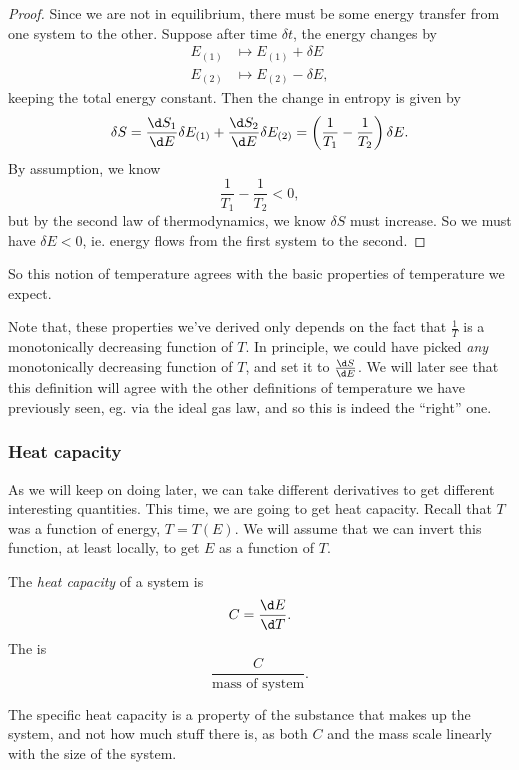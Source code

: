 \documentclass[a4paper]{article}
\begin{document}
\begin{proof}
  Since we are not in equilibrium, there must be some energy transfer from one system to the other. Suppose after time $\delta t$, the energy changes by
  \begin{align*}
    E_{(1)} & \mapsto E_{(1)} + \delta E\\
    E_{(2)} & \mapsto E_{(2)} - \delta E,
  \end{align*}
  keeping the total energy constant. Then the change in entropy is given by
  \[
    \delta S = \frac{\d S_1}{\d E} \delta E_{(1)} + \frac{\d S_2}{\d E} \delta E_{(2)} = \left(\frac{1}{T_1} - \frac{1}{T_2}\right) \delta E.
  \]
  By assumption, we know
  \[
    \frac{1}{T_1} - \frac{1}{T_2} < 0,
  \]
  but by the second law of thermodynamics, we know $\delta S$ must increase. So we must have $\delta E < 0$, ie. energy flows from the first system to the second.
\end{proof}
So this notion of temperature agrees with the basic properties of temperature we expect.

Note that, these properties we've derived only depends on the fact that $\frac{1}{T}$ is a monotonically decreasing function of $T$. In principle, we could have picked \emph{any} monotonically decreasing function of $T$, and set it to $\frac{\d S}{\d E}$. We will later see that this definition will agree with the other definitions of temperature we have previously seen, eg. via the ideal gas law, and so this is indeed the ``right'' one.

\subsubsection*{Heat capacity}
As we will keep on doing later, we can take different derivatives to get different interesting quantities. This time, we are going to get heat capacity. Recall that $T$ was a function of energy, $T = T(E)$. We will assume that we can invert this function, at least locally, to get $E$ as a function of $T$.
\begin{defi}
  The \emph{heat capacity} of a system is
  \[
    C = \frac{\d E}{\d T}.
  \]
  The  is
  \[
    \frac{C}{\text{mass of system}}.
  \]
\end{defi}
The specific heat capacity is a property of the substance that makes up the system, and not how much stuff there is, as both $C$ and the mass scale linearly with the size of the system.
\end{document}

